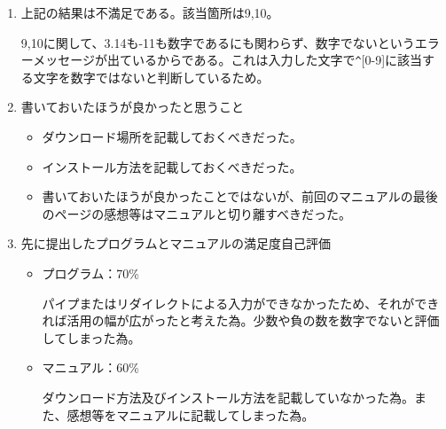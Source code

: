 \documentclass[10.5pt]{jsarticle}
\begin{document}
\begin{large}
\begin{enumerate}
\newpage
\item 上記の結果は不満足である。該当箇所は9,10。

9,10に関して、3.14も-11も数字であるにも関わらず、数字でないというエラーメッセージが出ているからである。これは入力した文字で\verb|^|[0-9]に該当する文字を数字ではないと判断しているため。\\

\item 書いておいたほうが良かったと思うこと
\begin{itemize}
  \item ダウンロード場所を記載しておくべきだった。
  \item インストール方法を記載しておくべきだった。
  \item 書いておいたほうが良かったことではないが、前回のマニュアルの最後のページの感想等はマニュアルと切り離すべきだった。\\
\end{itemize}

\item 先に提出したプログラムとマニュアルの満足度自己評価
\begin{itemize}
  \item プログラム：70\%
  
  パイプまたはリダイレクトによる入力ができなかったため、それができれば活用の幅が広がったと考えた為。少数や負の数を数字でないと評価してしまった為。\\
  \item マニュアル：60\%
  
  ダウンロード方法及びインストール方法を記載していなかった為。また、感想等をマニュアルに記載してしまった為。
\end{itemize}






\end{enumerate}
\end{large}
\end{document}
